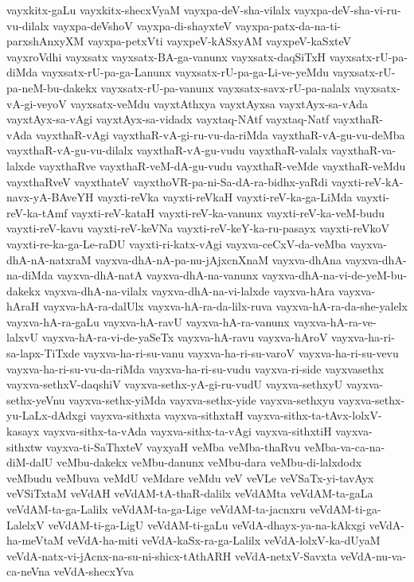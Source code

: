 {vayxkitx-gaLu
vayxkitx-shecxVyaM
vayxpa-deV-sha-vilalx
vayxpa-deV-sha-vi-ru-vu-dilalx
vayxpa-deVshoV
vayxpa-di-shayxteV
vayxpa-patx-da-na-ti-parxshAnxyXM
vayxpa-petxVti
vayxpeV-kASxyAM
vayxpeV-kaSxteV
vayxroVdhi
vayxsatx
vayxsatx-BA-ga-vanunx
vayxsatx-daqSiTxH
vayxsatx-rU-pa-diMda
vayxsatx-rU-pa-ga-Lanunx
vayxsatx-rU-pa-ga-Li-ve-yeMdu
vayxsatx-rU-pa-neM-bu-dakekx
vayxsatx-rU-pa-vanunx
vayxsatx-savx-rU-pa-nalalx
vayxsatx-vA-gi-veyoV
vayxsatx-veMdu
vayxtAthxya
vayxtAyxsa
vayxtAyx-sa-vAda
vayxtAyx-sa-vAgi
vayxtAyx-sa-vidadx
vayxtaq-NAtf
vayxtaq-Natf
vayxthaR-vAda
vayxthaR-vAgi
vayxthaR-vA-gi-ru-vu-da-riMda
vayxthaR-vA-gu-vu-deMba
vayxthaR-vA-gu-vu-dilalx
vayxthaR-vA-gu-vudu
vayxthaR-valalx
vayxthaR-va-lalxde
vayxthaRve
vayxthaR-veM-dA-gu-vudu
vayxthaR-veMde
vayxthaR-veMdu
vayxthaRveV
vayxthateV
vayxthoVR-pa-ni-Sa-dA-ra-bidhx-yaRdi
vayxti-reV-kA-navx-yA-BAveYH
vayxti-reVka
vayxti-reVkaH
vayxti-reV-ka-ga-LiMda
vayxti-reV-ka-tAmf
vayxti-reV-kataH
vayxti-reV-ka-vanunx
vayxti-reV-ka-veM-budu
vayxti-reV-kavu
vayxti-reV-keVNa
vayxti-reV-keY-ka-ru-pasayx
vayxti-reVkoV
vayxti-re-ka-ga-Le-raDU
vayxti-ri-katx-vAgi
vayxva-ceCxV-da-veMba
vayxva-dhA-nA-natxraM
vayxva-dhA-nA-pa-nu-jAjxcnXnaM
vayxva-dhAna
vayxva-dhA-na-diMda
vayxva-dhA-natA
vayxva-dhA-na-vanunx
vayxva-dhA-na-vi-de-yeM-bu-dakekx
vayxva-dhA-na-vilalx
vayxva-dhA-na-vi-lalxde
vayxva-hAra
vayxva-hAraH
vayxva-hA-ra-dalUlx
vayxva-hA-ra-da-lilx-ruva
vayxva-hA-ra-da-she-yalelx
vayxva-hA-ra-gaLu
vayxva-hA-ravU
vayxva-hA-ra-vanunx
vayxva-hA-ra-ve-lalxvU
vayxva-hA-ra-vi-de-yaSeTx
vayxva-hA-ravu
vayxva-hAroV
vayxva-ha-ri-sa-lapx-TiTxde
vayxva-ha-ri-su-vanu
vayxva-ha-ri-su-varoV
vayxva-ha-ri-su-vevu
vayxva-ha-ri-su-vu-da-riMda
vayxva-ha-ri-su-vudu
vayxva-ri-side
vayxvasethx
vayxva-sethxV-daqshiV
vayxva-sethx-yA-gi-ru-vudU
vayxva-sethxyU
vayxva-sethx-yeVnu
vayxva-sethx-yiMda
vayxva-sethx-yide
vayxva-sethxyu
vayxva-sethx-yu-LaLx-dAdxgi
vayxva-sithxta
vayxva-sithxtaH
vayxva-sithx-ta-tAvx-lolxV-kasayx
vayxva-sithx-ta-vAda
vayxva-sithx-ta-vAgi
vayxva-sithxtiH
vayxva-sithxtw
vayxva-ti-SaThxteV
vayxyaH
veMba
veMba-thaRvu
veMba-va-ca-na-diM-dalU
veMbu-dakekx
veMbu-danunx
veMbu-dara
veMbu-di-lalxdodx
veMbudu
veMbuva
veMdU
veMdare
veMdu
veV
veVLe
veVSaTx-yi-tavAyx
veVSiTxtaM
veVdAH
veVdAM-tA-thaR-dalilx
veVdAMta
veVdAM-ta-gaLa
veVdAM-ta-ga-Lalilx
veVdAM-ta-ga-Lige
veVdAM-ta-jacnxru
veVdAM-ti-ga-LalelxV
veVdAM-ti-ga-LigU
veVdAM-ti-gaLu
veVdA-dhayx-ya-na-kAkxgi
veVdA-ha-meVtaM
veVdA-ha-miti
veVdA-kaSx-ra-ga-Lalilx
veVdA-lolxV-ka-dUyaM
veVdA-natx-vi-jAcnx-na-su-ni-shicx-tAthARH
veVdA-netxV-Savxta
veVdA-nu-va-ca-neVna
veVdA-shecxYva
}
